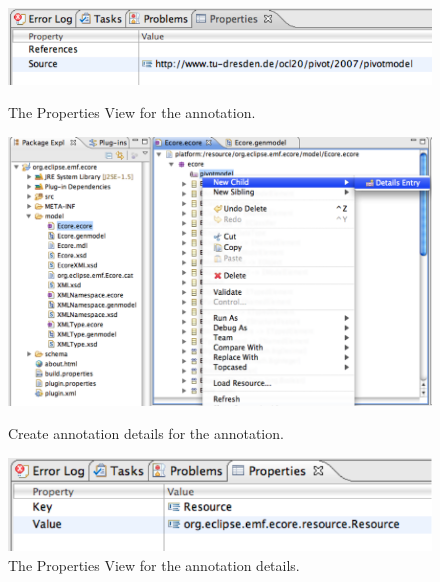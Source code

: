 \begin{figure}[!p]
	\centering
	\includegraphics[width=0.8\linewidth]{figures/pivotModelAdaption/AnnotationProperties}
	\caption{The Properties View for the annotation.}
	\label{pic:pivotModelAdaption:AnnotationProperties}

  \vspace{5.0em}
 
 	\centering
	\includegraphics[width=1.0\linewidth]{figures/pivotModelAdaption/CreateAnnotationDetails}
	\caption{Create annotation details for the annotation.}
	\label{pic:pivotModelAdaption:CreateAnnotationDetails}

  \vspace{5.0em}
 
 	\centering
	\includegraphics[width=0.8\linewidth]{figures/pivotModelAdaption/AnnotationDetailsProperties}
	\caption{The Properties View for the annotation details.}
	\label{pic:pivotModelAdaption:AnnotationDetailsProperties}
\end{figure}

